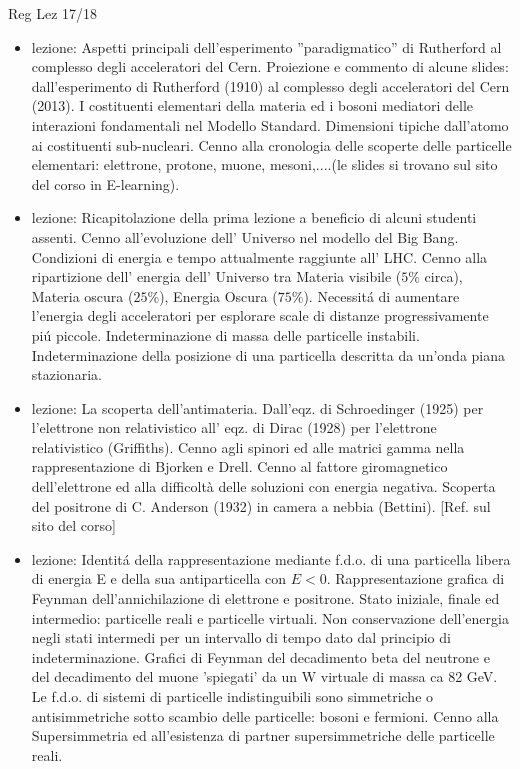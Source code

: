 \begin{frame}[allowframebreaks]{Reg Lez 17/18}
\begin{itemize}  
\item lezione: Aspetti principali dell'esperimento ''paradigmatico'' di Rutherford al complesso degli acceleratori del Cern. Proiezione e commento di alcune slides: dall'esperimento di Rutherford (1910) al complesso degli acceleratori del Cern (2013). I costituenti elementari della materia ed i bosoni mediatori delle interazioni fondamentali nel Modello Standard. Dimensioni tipiche dall'atomo ai costituenti sub-nucleari. Cenno alla cronologia delle scoperte delle particelle elementari: elettrone, protone, muone, mesoni,....(le slides si trovano sul sito del corso in E-learning). 
\item lezione: Ricapitolazione della prima lezione a beneficio di alcuni studenti assenti. Cenno all'evoluzione dell' Universo nel modello del Big Bang. Condizioni di energia e tempo attualmente raggiunte all' LHC. Cenno alla ripartizione dell' energia dell' Universo tra Materia visibile ($5\%$ circa), Materia oscura ($25\%$), Energia Oscura ($75\%$). Necessit\'a di aumentare l'energia degli acceleratori per esplorare scale di distanze progressivamente pi\'u piccole. Indeterminazione di massa delle particelle instabili. Indeterminazione della posizione di una particella descritta da un'onda piana stazionaria.
\item lezione: La scoperta dell'antimateria. Dall'eqz. di Schroedinger (1925) per l'elettrone non relativistico all' eqz. di Dirac (1928) per l'elettrone relativistico (Griffiths). Cenno agli spinori ed alle matrici gamma nella rappresentazione di Bjorken e Drell. Cenno al fattore giromagnetico dell'elettrone ed alla difficoltà delle soluzioni con energia negativa. Scoperta del positrone di C. Anderson (1932) in camera a nebbia (Bettini). [Ref. sul sito del corso]
\item lezione: Identit\'a della rappresentazione mediante f.d.o. di una particella libera di energia E e della sua antiparticella con $E<0$. Rappresentazione grafica di Feynman dell'annichilazione di elettrone e positrone. Stato iniziale, finale ed intermedio: particelle reali e particelle virtuali. Non conservazione dell'energia negli stati intermedi per un intervallo di tempo dato dal principio di indeterminazione. Grafici di Feynman del decadimento beta del neutrone e del decadimento del muone 'spiegati' da un W virtuale di massa ca 82 GeV. Le f.d.o. di sistemi di particelle indistinguibili sono simmetriche o antisimmetriche sotto scambio delle particelle: bosoni e fermioni. Cenno alla Supersimmetria ed all'esistenza di partner supersimmetriche delle particelle reali.

\end{itemize}
\end{frame}
